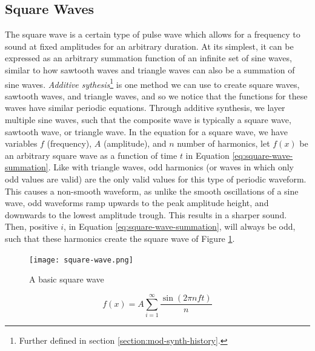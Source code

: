 \subsection{Square Waves}

The square wave is a certain type of pulse wave which allows for a frequency to sound at fixed amplitudes for an arbitrary duration. At its simplest, it can be expressed as an arbitrary summation function of an infinite set of sine waves, similar to how sawtooth waves and triangle waves can also be a summation of sine waves. \textit{Additive sythesis}\footnote{Further defined in section \ref{section:mod-synth-history}.} is one method we can use to create square waves, sawtooth waves, and triangle waves, and so we notice that the functions for these waves have similar periodic equations. Through additive synthesis, we layer multiple sine waves, such that the composite wave is typically a square wave, sawtooth wave, or triangle wave. In the equation for a square wave, we have variables $f$ (frequency), $A$ (amplitude), and $n$ number of harmonics, let $f(x)$ be an arbitrary square wave as a function of time $t$ in Equation \ref{eq:square-wave-summation}. Like with triangle waves, odd harmonics (or waves in which only odd values are valid) are the only valid values for this type of periodic waveform. This causes a non-smooth waveform, as unlike the smooth oscillations of a sine wave, odd waveforms ramp upwards to the peak amplitude height, and downwards to the lowest amplitude trough. This results in a sharper sound. Then, positive $i$, in Equation \ref{eq:square-wave-summation}, will always be odd, such that these harmonics create the square wave of Figure \ref{fig:square-wave}.

\begin{figure}[ht]
  \centering
  \texttt{[image: square-wave.png]}
  \caption{A basic square wave}
  \label{fig:square-wave}
\end{figure}

\begin{equation}
	f(x) = A\sum_{i=1}^{\infty}\frac{\sin(2\pi nft)}{n}
	\label{eq:square-wave-summation}
\end{equation}

